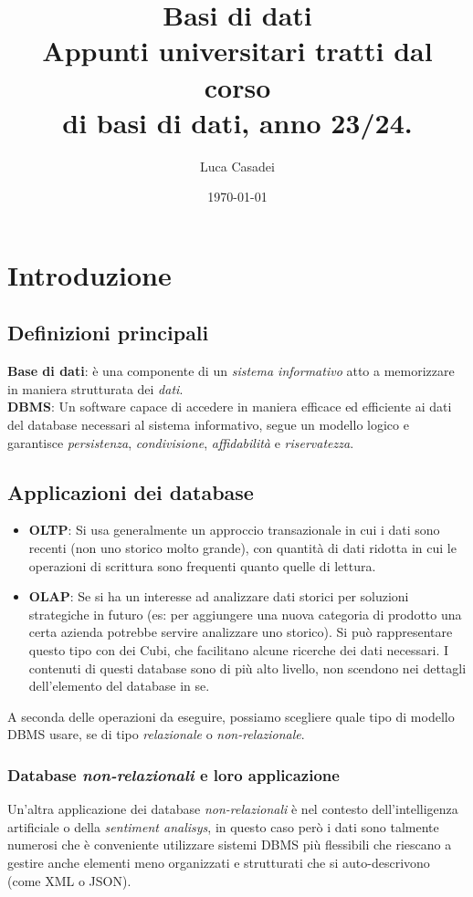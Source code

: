 \documentclass[a4paper,12pt]{report}
\title{\textbf{Basi di dati}\\Appunti universitari tratti dal corso\\di basi di dati, anno 23/24.}
\author{Luca Casadei}
\date{\today}
\begin{document}
	\maketitle
	\tableofcontents
	\chapter{Introduzione}
	\section{Definizioni principali}
	\textbf{Base di dati}: è una componente di un \textit{sistema informativo} atto a memorizzare in maniera strutturata dei \textit{dati}.\\
	\textbf{DBMS}: Un software capace di accedere in maniera efficace ed efficiente ai dati del database necessari al sistema informativo, segue un modello logico e garantisce \textit{persistenza}, \textit{condivisione}, \textit{affidabilità} e \textit{riservatezza}.
	\section{Applicazioni dei database}
	\begin{itemize}
		\item \textbf{OLTP}: Si usa generalmente un approccio transazionale in cui i dati sono recenti (non uno storico molto grande), con quantità di dati ridotta in cui le operazioni di scrittura sono frequenti quanto quelle di lettura.
		\item \textbf{OLAP}: Se si ha un interesse ad analizzare dati storici per soluzioni strategiche in futuro (es: per aggiungere una nuova categoria di prodotto una certa azienda potrebbe servire analizzare uno storico). Si può rappresentare questo tipo con dei Cubi, che facilitano alcune ricerche dei dati necessari. I contenuti di questi database sono di più alto livello, non scendono nei dettagli dell'elemento del database in se.
	\end{itemize}
A seconda delle operazioni da eseguire, possiamo scegliere quale tipo di modello DBMS usare, se di tipo \textit{relazionale} o \textit{non-relazionale}.
\subsection{Database \textit{non-relazionali} e loro applicazione}
Un'altra applicazione dei database \textit{non-relazionali} è nel contesto dell'intelligenza artificiale o della \textit{sentiment analisys}, in questo caso però i dati sono talmente numerosi che è conveniente utilizzare sistemi DBMS più flessibili che riescano a gestire anche elementi meno organizzati e strutturati che si auto-descrivono (come XML o JSON).\\
\end{document}

